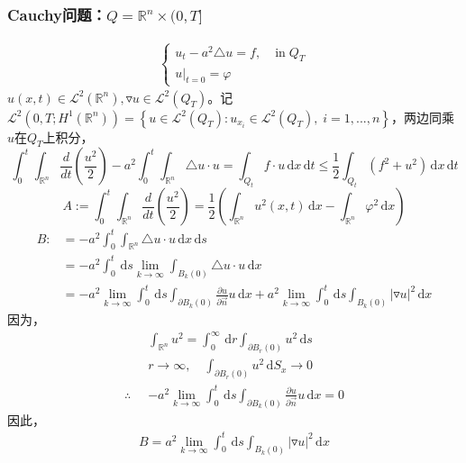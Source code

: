 \documentclass[11pt, a4paper]{article}
\theoremstyle{theorem}
\newcommand{\intd}[1]{\,\mathrm{d}{#1}}
\begin{document}
\subsubsection{Cauchy问题：$Q = \mathbb{R}^n \times (0,T]$}
\begin{align}
\label{Q4-9-3}
  \begin{cases}
    u_t - a^2 \triangle u = f, \; &\text{in} \; Q_T \\
    u \bigg|_{t = 0} = \varphi
  \end{cases}
\end{align}
$u(x,t) \in \mathcal{L}^2(\mathbb{R}^n), \triangledown u \in \mathcal{L}^2(Q_T)$。记$\mathcal{L}^2(0,T; H^1(\mathbb{R}^n)) = \left\{u \in \mathcal{L}^2(Q_T): u_{x_i} \in \mathcal{L}^2(Q_T), \; i = 1,...,n \right\}$，两边同乘$u$在$Q_T$上积分，
$$
\int_0^t \int_{\mathbb{R}^n} \frac{d}{d t} \left(\frac{u^2}{2}\right) - a^2 \int_0^t \int_{\mathbb{R}^n} \triangle u \cdot u = \int_{Q_t} f \cdot u \intd x \intd t \leq \frac{1}{2} \int_{Q_t} (f^2 + u^2) \intd x \intd t
$$
$$
A := \int_0^t \int_{\mathbb{R}^n} \frac{d}{d t} \left(\frac{u^2}{2}\right) = \frac{1}{2} \left(\int_{\mathbb{R}^n} u^2(x,t) \intd x - \int_{\mathbb{R}^n} \varphi^2 \intd x\right)
$$
\begin{align*}
B :&= - a^2 \int_0^t \int_{\mathbb{R}^n} \triangle u \cdot u \intd x \intd s \\
&= -a^2 \int_0^t \intd s \lim\limits_{k \rightarrow \infty} \int_{B_k(0)} \triangle u \cdot u \intd x \\
&= -a^2 \lim\limits_{k \rightarrow \infty} \int_0^t \intd s \int_{\partial B_k(0)} \frac{\partial u}{\partial \vec{n}} u \intd x + a^2 \lim\limits_{k \rightarrow \infty} \int_0^t \intd s \int_{B_k(0)} |\triangledown u|^2 \intd x
\end{align*}
因为，
\begin{align*}
    &\int_{\mathbb{R}^n} u^2 = \int_0^\infty \intd r \int_{\partial B_r(0)} u^2 \intd s \\
    & r \rightarrow \infty, \quad \int_{\partial B_{r}(0)} u^2 \intd S_x \rightarrow 0 \\
  \therefore \; \; &-a^2 \lim\limits_{k \rightarrow \infty} \int_0^t \intd s \int_{\partial B_k(0)} \frac{\partial u}{\partial \vec{n}} u \intd x = 0
\end{align*}
因此，
\begin{align}
    B = a^2 \lim\limits_{k \rightarrow \infty} \int_0^t \intd s \int_{B_k(0)} |\triangledown u|^2 \intd x
\end{align}
\end{document}

